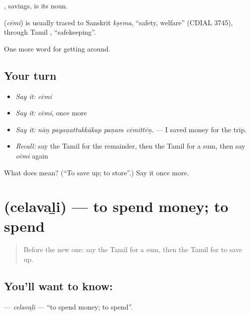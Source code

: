 , savings, is its noun.

\begin{cousinweb}
\textbf{} (\emph{cēmi}) is usually traced to Sanskrit \emph{kṣema}, \textquotedblleft{}safety, welfare\textquotedblright{} (CDIAL 3745), through Tamil , \textquotedblleft{}safekeeping\textquotedblright{}.
\end{cousinweb}

\begin{grammarlens}[title={What you've built}]
One more word for getting around.
\end{grammarlens}

\subsection*{Your turn}
\begin{itemize}
\raggedright
  \item \emph{Say it:} \emph{cēmi}
  \item \emph{Say it:} \emph{cēmi}, once more
  \item \emph{Say it:} \emph{nāṉ payaṇattukkākap paṇam cēmittēṉ.} — I saved money for the trip.
  \item \emph{Recall:} say the Tamil for the remainder, then the Tamil for a sum, then say \emph{cēmi} again
\end{itemize}

\begin{tcolorbox}[breakable,colback=teal!4,colframe=teal!35!black,title={Before you move on}]
What does  mean? (\textquotedblleft{}To save up; to store\textquotedblright{}.) Say it once more.
\end{tcolorbox}
\section[\texorpdfstring{\ta{செலவழி} (celavaḻi)}{செலவழி (celavaḻi)}]{ (celavaḻi) — to spend money; to spend}

\label{lesson:TA-C448-celavali}



\begin{quote}
Before the new one: say the Tamil for a sum, then the Tamil for to save up.
\end{quote}

\subsection*{You'll want to know: }
\textbf{} — \emph{celavaḻi} — \textquotedblleft{}to spend money; to spend\textquotedblright{}.


